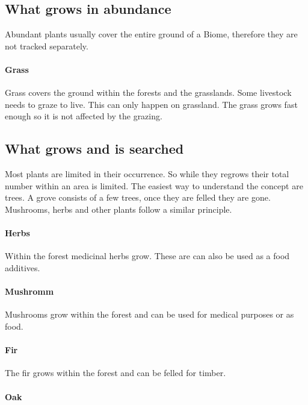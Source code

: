 \subsection{What grows in abundance}\label{ch:Goods:Nature:Plants:Abundant}

Abundant plants usually cover the entire ground of a Biome, therefore they are
not tracked separately.

\paragraph{Grass}

Grass covers the ground within the forests and the grasslands. Some livestock
needs to graze to live. This can only happen on grassland. The grass grows fast
enough so it is not affected by the grazing.

\subsection{What grows and is searched}\label{ch:Goods:Nature:Plants:Limited}

Most plants are limited in their occurrence. So while they regrows their total
number within an area is limited. The easiest way to understand the concept are
trees. A grove consists of a few trees, once they are felled they are gone.
Mushrooms, herbs and other plants follow a similar principle.

\paragraph{Herbs}

Within the forest medicinal herbs grow. These are can also be used as a food
additives.

\paragraph{Mushromm}

Mushrooms grow within the forest and can be used for medical purposes or as
food.

\paragraph{Fir}

The fir grows within the forest and can be felled for timber.

\paragraph{Oak}

